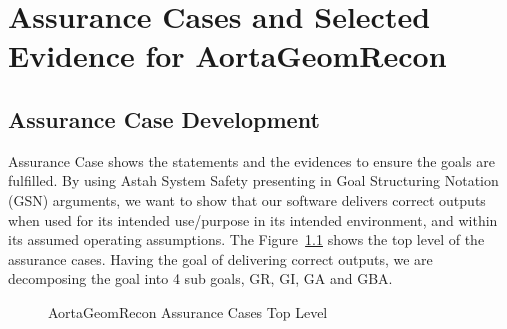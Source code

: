 \chapter{Assurance Cases and Selected Evidence for AortaGeomRecon}

\section{Assurance Case Development}

Assurance Case shows the statements and the evidences to ensure the goals are fulfilled. By using Astah System Safety presenting in Goal Structuring Notation (GSN) arguments, we want to show that our software delivers correct outputs when used for its intended use/purpose in its intended environment, and within its assumed operating assumptions. The Figure~\ref{fig_agr_ac_top} shows the top level of the assurance cases. Having the goal of delivering correct outputs, we are decomposing the goal into 4 sub goals, GR, GI, GA and GBA.

\begin{figure}[H]
    \centering
    \caption[AortaGeomRecon Assurance Cases Top Level]{AortaGeomRecon Assurance Cases Top Level}
    \label{fig_agr_ac_top}
\end{figure}


